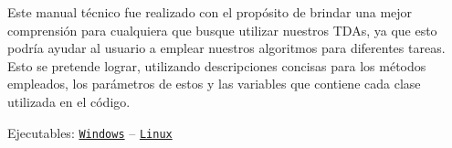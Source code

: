 \begin{center} Este manual técnico fue realizado con el propósito de brindar una mejor comprensión para cualquiera que busque utilizar nuestros T\+D\+As, ya que esto podría ayudar al usuario a emplear nuestros algoritmos para diferentes tareas. Esto se pretende lograr, utilizando descripciones concisas para los métodos empleados, los parámetros de estos y las variables que contiene cada clase utilizada en el código.   \end{center} 

\begin{center}Ejecutables\+: \href{http://github.com/fcc-2018/arboles-avl/raw/master/arbolAVL.exe}{\tt Windows} -- \href{http://github.com/fcc-2018/arboles-avl/raw/master/arbolAVL}{\tt Linux}\end{center} 

\begin{center}  \end{center}  